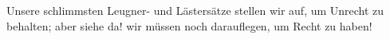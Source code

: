 Unsere schlimmsten Leugner- und Lästersätze stellen wir auf, um Unrecht zu behalten; aber siehe da! wir müssen noch darauflegen, um Recht zu haben!
\par

